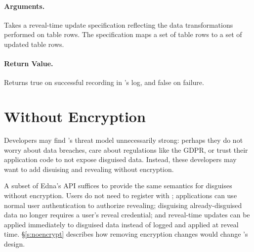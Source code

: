    \paragraph{Arguments.} Takes a reveal-time update specification reflecting
    the data transformations performed on table rows. The specification maps a
    set of table rows to a set of updated table rows.

    \paragraph{Return Value.} Returns true on successful recording in \sys's
    log, and false on failure.

\section{\sys Without Encryption}
\label{s:semantics:noencrypt}

Developers may find \sys's threat model unnecessarily strong: perhaps they do
not worry about data breaches, care about regulations like the GDPR, or trust
their application code to not expose disguised data. Instead, these developers
may want to add disuising and revealing without encryption.
%

%
A subset of Edna's API suffices to provide the same semantics for disguises
without encryption. Users do not need to register with \sys; applications can
use normal user authentication to authorize revealing; disguising
already-disguised data no longer requires a user's reveal credential; and
reveal-time updates can be applied immediately to disguised data instead of
logged and applied at reveal time.
%
\S\ref{s:noencrypt} describes how removing encryption changes would
change \sys's design.

%
%
